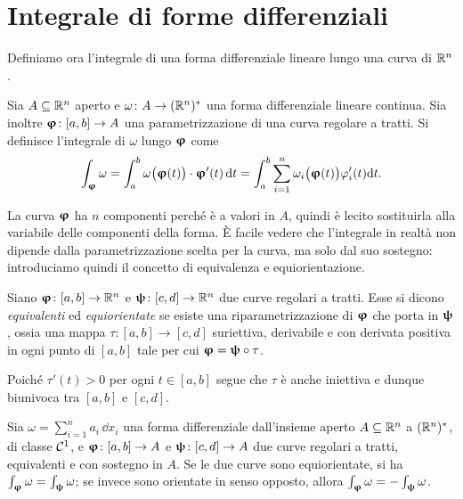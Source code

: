 \section{Integrale di forme differenziali}
Definiamo ora l'integrale di una forma differenziale lineare lungo una curva di $\mathbb{R}^n$.
\begin{definizione} \label{d:integrale-1forma}
	Sia $A\subseteq\mathbb{R}^n$ aperto e $\omega\colon A\to(\mathbb{R}^n)^*$ una forma differenziale lineare continua.
	Sia inoltre $\bm{\upvarphi}\colon[a,b]\to A$ una parametrizzazione di una curva regolare a tratti.
	Si definisce l'integrale di $\omega$ lungo $\bm{\upvarphi}$ come
	\begin{equation} 
		\int_{\bm{\upvarphi}}\omega=\int_a^b{\omega\big(\bm{\upvarphi}(t)\big)}\cdot{\bm{\upvarphi}'(t)}\,\textup{d} t=\int_a^b\sum_{i=1}^n\omega_i\big(\bm{\upvarphi}(t)\big)\varphi_i'(t)\textup{d} t.
		\label{eq:integrale-1forma}
	\end{equation}
\end{definizione}
	La curva $\bm{\upvarphi}$ ha $n$ componenti perch\'e è a valori in $A$, quindi è lecito sostituirla alla variabile delle componenti della forma.
	È facile vedere che l'integrale in realtà non dipende dalla parametrizzazione scelta per la curva, ma solo dal suo sostegno: introduciamo quindi il concetto di equivalenza e equiorientazione.
\begin{definizione}
	Siano $\bm{\upvarphi}\colon[a,b]\to\mathbb{R}^n$ e $\bm{\uppsi}\colon[c,d]\to\mathbb{R}^n$ due curve regolari a tratti.
	Esse si dicono \emph{equivalenti} ed \emph{equiorientate} se esiste una riparametrizzazione di $\bm{\upvarphi}$ che porta in $\bm{\uppsi}$, ossia una mappa $\tau\colon[a,b]\to[c,d]$ suriettiva, derivabile e con derivata positiva in ogni punto di $[a,b]$ tale per cui $\bm{\upvarphi}=\bm{\uppsi}\circ\tau$.
\end{definizione}
Poiché $\tau'(t)>0$ per ogni $t\in[a,b]$ segue che $\tau$ è anche iniettiva e dunque biunivoca tra $[a,b]$ e $[c,d]$.
\begin{teorema}
	Sia $\omega=\sum_{i=1}^na_i\,\dd x_i$ una forma differenziale dall'insieme aperto $A\subseteq\mathbb{R}^n$ a $(\mathbb{R}^n)^*$, di classe $\mathcal{C}^{{1}}$, e $\bm{\upvarphi}\colon[a,b]\to A$ e $\bm{\uppsi}\colon [c,d]\to A$ due curve regolari a tratti, equivalenti e con sostegno in $A$.
	Se le due curve sono equiorientate, si ha $\int_{\bm{\upvarphi}}\omega=\int_{\bm{\uppsi}}\omega$; se invece sono orientate in senso opposto, allora $\int_{\bm{\upvarphi}}\omega=-\int_{\bm{\uppsi}}\omega$.
\end{teorema}

